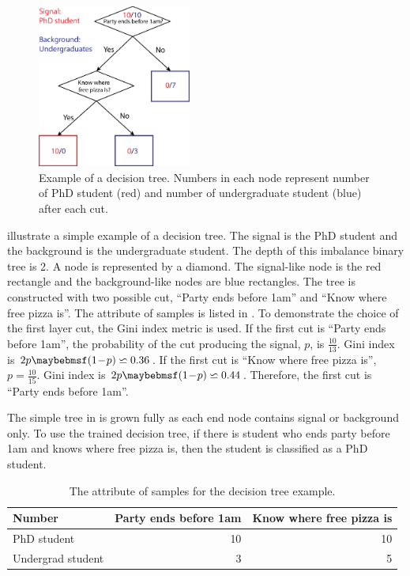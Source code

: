 \begin{figure}[!tbp]
\includegraphics[width=0.45\textwidth]{doubleHiggs/mva/BDTcomic}
\caption[Example of a decision tree. ]
{Example of a decision tree. Numbers in each node represent number of PhD student (red) and number of undergraduate student (blue) after each cut.}
   \label{fig:doubleHiggsMVAdecisionTree}
\end{figure}

 illustrate a simple example of a decision tree. The signal is the PhD student and the background is the undergraduate student. The depth of this imbalance binary  tree is 2. A node is represented by a diamond.  The signal-like node is the red rectangle and the background-like nodes are blue rectangles. The tree is constructed with two possible cut, ``Party ends before 1am'' and ``Know where free pizza is''. The attribute of samples is listed in . To demonstrate the choice of the first layer cut, the Gini index metric is used. If the first cut is ``Party ends before 1am'', the probability of the cut producing the signal, $p$, is $\frac{10}{13}$. Gini index is $2p\parenths{1\!-\!p} \backsimeq 0.36 $. If the first cut is ``Know where free pizza is'', $p=\frac{10}{15}$. Gini index is $2p\parenths{1\!-\!p} \backsimeq 0.44 $. Therefore, the first cut is ``Party ends before 1am''.

The simple tree in  is grown fully as each end node contains signal or background only. To use the trained decision tree, if there is student who ends party before 1am and knows where free pizza is, then the student is classified as a PhD student.

\begin{table}[!tbp]\centering
\small
\begin{tabular}{lrr}
\hline \hline
Number & Party ends before 1am  & Know where free pizza is\\
\hline
PhD student & 10 & 10 \\
Undergrad student & 3 & 5 \\
\hline \hline
\end{tabular}
\caption
{The attribute of samples for the decision tree example.}
\label{tab:doubleHiggsDecisionTreeComic}
\end{table}

